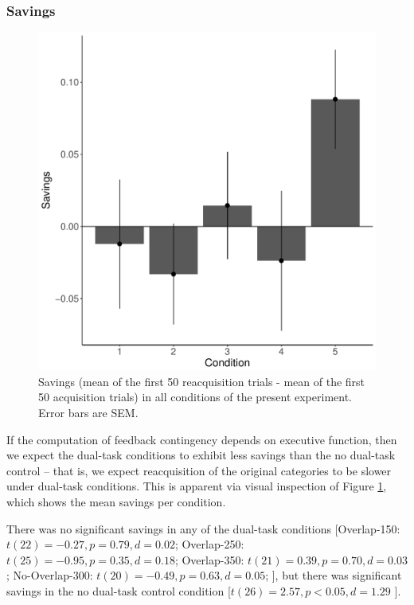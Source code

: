 \documentclass[apacite,draftfirst,jou]{apa6}
\begin{document}
\subsubsection*{Savings}
\begin{figure}[t]
\centering \includegraphics[width=1.0\textwidth]{../figures/fig_savings.pdf}
\caption{Savings (mean of the first 50 reacquisition trials - mean of the first
  50 acquisition trials) in all conditions of the present experiment.
  Error bars are SEM.}
  \label{fig:savings}
\end{figure}

If the computation of feedback contingency depends on executive function, then
we expect the dual-task conditions to exhibit less savings than the no dual-task
control -- that is, we expect reacquisition of the original categories to be
slower under dual-task conditions. This is apparent via visual inspection of
Figure \ref{fig:savings}, which shows the mean savings per condition.

There was no significant savings in any of the dual-task conditions
[Overlap-150: $t(22) = -0.27, p = 0.79, d = 0.02$; Overlap-250: $t(25) = -0.95,
p = 0.35, d = 0.18$; Overlap-350: $t(21) = 0.39, p = 0.70, d = 0.03$;
No-Overlap-300: $t(20) = -0.49, p = 0.63, d = 0.05$; ], but there was
significant savings in the no dual-task control condition [$t(26) =
2.57, p < 0.05, d = 1.29$ ].
\end{document}
